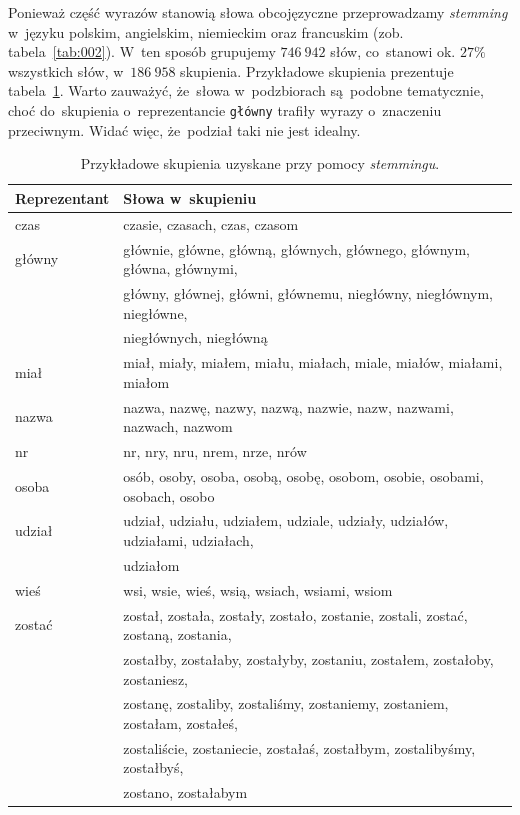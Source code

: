 \documentclass{praca1}
\begin{document}
Ponieważ część wyrazów stanowią słowa obcojęzyczne przeprowadzamy \emph{stemming} w~języku polskim, angielskim, niemieckim oraz francuskim (zob. tabela~\ref{tab:002}). W~ten sposób grupujemy $746\ 942$ słów, co~stanowi ok. $27\%$ wszystkich słów, w~$186\ 958$ skupienia. Przykładowe skupienia prezentuje tabela~\ref{tab:003}. Warto zauważyć, że~słowa w~podzbiorach są~podobne tematycznie, choć do~skupienia o~reprezentancie \verb|główny| trafiły wyrazy o~znaczeniu przeciwnym. Widać więc, że~podział taki nie jest idealny.

\begin{table}[!h]
\centering
\begin{tabular}{|l|l|}
  \hline
Reprezentant & Słowa w~skupieniu \\ \hline
  \hline
czas & czasie, czasach, czas, czasom \\ \hline
  główny & głównie, główne, główną, głównych, głównego, głównym, główna, głównymi, \\
& główny, głównej, główni, głównemu, niegłówny, niegłównym, niegłówne, \\
& niegłównych, niegłówną \\ \hline
  miał & miał, miały, miałem, miału, miałach, miale, miałów, miałami, miałom \\ \hline
  nazwa & nazwa, nazwę, nazwy, nazwą, nazwie, nazw, nazwami, nazwach, nazwom \\ \hline
  nr~& nr, nry, nru, nrem, nrze, nrów \\ \hline
  osoba & osób, osoby, osoba, osobą, osobę, osobom, osobie, osobami, osobach, osobo \\ \hline
  udział & udział, udziału, udziałem, udziale, udziały, udziałów, udziałami, udziałach, \\
& udziałom \\ \hline
  wieś & wsi, wsie, wieś, wsią, wsiach, wsiami, wsiom \\ \hline
  zostać & został, została, zostały, zostało, zostanie, zostali, zostać, zostaną, zostania, \\
& zostałby, zostałaby, zostałyby, zostaniu, zostałem, zostałoby, zostaniesz,\\
& zostanę, zostaliby, zostaliśmy, zostaniemy, zostaniem, zostałam, zostałeś, \\ 
& zostaliście, zostaniecie, zostałaś, zostałbym, zostalibyśmy, zostałbyś, \\
& zostano, zostałabym \\ 
   \hline
\end{tabular}
\caption{Przykładowe skupienia uzyskane przy pomocy \emph{stemmingu}.}
\label{tab:003}
\end{table}
\end{document}
